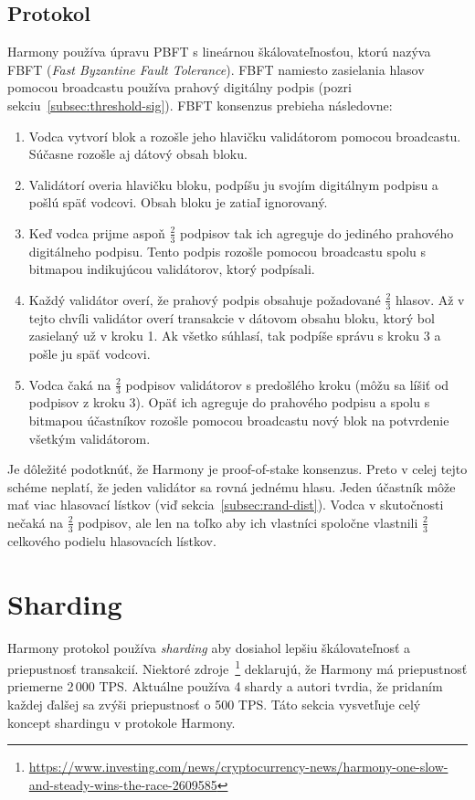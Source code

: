 \subsection{Protokol}\label{subsec:fbft}
Harmony používa úpravu PBFT s lineárnou škálovateľnosťou, ktorú nazýva FBFT (\textit{Fast Byzantine Fault Tolerance}). FBFT namiesto zasielania hlasov pomocou broadcastu používa prahový digitálny podpis (pozri sekciu~\ref{subsec:threshold-sig}). FBFT konsenzus prebieha následovne:
\begin{enumerate}
	\item Vodca vytvorí blok a rozošle jeho hlavičku validátorom pomocou broadcastu. Súčasne rozošle aj dátový obsah bloku.
	\item Validátorí overia hlavičku bloku, podpíšu ju svojím digitálnym podpisu a pošlú späť vodcovi. Obsah bloku je zatiaľ ignorovaný.
	\item Keď vodca prijme aspoň $\frac{2}{3}$ podpisov tak ich agreguje do jediného prahového digitálneho podpisu. Tento podpis rozošle pomocou broadcastu spolu s bitmapou indikujúcou validátorov, ktorý podpísali.
	\item Každý validátor overí, že prahový podpis obsahuje požadované $\frac{2}{3}$ hlasov. Až v tejto chvíli validátor overí transakcie v dátovom obsahu bloku, ktorý bol zasielaný už v kroku 1. Ak všetko súhlasí, tak podpíše správu s kroku 3 a pošle ju späť vodcovi.
	\item Vodca čaká na $\frac{2}{3}$ podpisov validátorov s predošlého kroku (môžu sa líšiť od podpisov z kroku 3). Opäť ich agreguje do prahového podpisu a spolu s bitmapou účastníkov rozošle pomocou broadcastu nový blok na potvrdenie všetkým validátorom. 
\end{enumerate}
Je dôležité podotknúť, že Harmony je proof-of-stake konsenzus. Preto v celej tejto schéme neplatí, že jeden validátor sa rovná jednému hlasu. Jeden účastník môže mať viac hlasovací lístkov (viď sekcia~\ref{subsec:rand-dist}). Vodca v skutočnosti nečaká na $\frac{2}{3}$ podpisov, ale len na toľko aby ich vlastníci spoločne vlastnili $\frac{2}{3}$ celkového podielu hlasovacích lístkov.~\cite{harmonyWp}

\section{Sharding}

Harmony protokol používa \textit{sharding} aby dosiahol lepšiu škálovateľnosť a priepustnosť transakcií. Niektoré zdroje~\footnote{\url{https://www.investing.com/news/cryptocurrency-news/harmony-one-slow-and-steady-wins-the-race-2609585}} deklarujú, že Harmony má priepustnosť priemerne 2\,000 TPS. Aktuálne používa 4 shardy a autori tvrdia, že pridaním každej ďalšej sa zvýši priepustnosť o 500 TPS. Táto sekcia vysvetľuje celý koncept shardingu v protokole Harmony.

